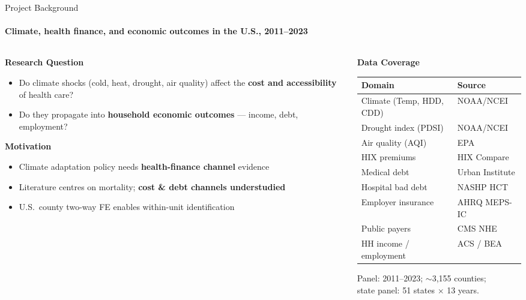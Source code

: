 \documentclass[aspectratio=169,11pt]{beamer}
\newcommand{\emphcolor}[1]{{\color{WarmOrange}\textbf{#1}}}
\newcommand{\tealtext}[1]{{\color{Teal}#1}}
\newcommand{\graytext}[1]{{\color{WarmGray}#1}}
\begin{document}
\begin{frame}{Project Background}
  \framesubtitle{Climate, health finance, and economic outcomes in the U.S., 2011--2023}
  \begin{columns}[T]
    \begin{column}{0.47\textwidth}
      \footnotesize
      \textbf{\tealtext{Research Question}}
      \begin{itemize}\itemsep0.15em
        \item Do climate shocks (cold, heat, drought, air quality) affect the \emphcolor{cost and accessibility} of health care?
        \item Do they propagate into \emphcolor{household economic outcomes} — income, debt, employment?
      \end{itemize}
      \vspace{0.15em}
      \textbf{\tealtext{Motivation}}
      \begin{itemize}\itemsep0.15em
        \item Climate adaptation policy needs \emphcolor{health-finance channel} evidence
        \item Literature centres on mortality; \emphcolor{cost \& debt channels understudied}
        \item U.S.\ county two-way FE enables within-unit identification
      \end{itemize}
    \end{column}
    \begin{column}{0.47\textwidth}
      \textbf{\tealtext{Data Coverage}}\\[0.3em]
      \small
      \begin{tabular}{ll}
        \toprule
        Domain & Source \\
        \midrule
        Climate (Temp, HDD, CDD) & NOAA/NCEI \\
        Drought index (PDSI)     & NOAA/NCEI \\
        Air quality (AQI)        & EPA \\
        HIX premiums             & HIX Compare \\
        Medical debt             & Urban Institute \\
        Hospital bad debt        & NASHP HCT \\
        Employer insurance       & AHRQ MEPS-IC \\
        Public payers            & CMS NHE \\
        HH income / employment   & ACS / BEA \\
        \bottomrule
      \end{tabular}
      \vspace{0.35em}
      \graytext{\scriptsize Panel: 2011--2023; $\sim$3,155 counties;\\ state panel: 51 states $\times$ 13 years.}
    \end{column}
  \end{columns}
\end{frame}
\end{document}
